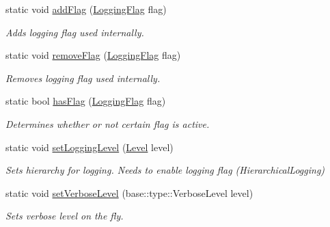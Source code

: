 \begin{DoxyCompactItemize}
static void \hyperlink{classel_1_1_loggers_aedd2de02dd701b0f20ddaa10f1f728f1}{add\+Flag} (\hyperlink{namespaceel_a2784aacd04cb7816ac1c0b20fcbf83cb}{Logging\+Flag} flag)
\begin{DoxyCompactList}\small\item\em Adds logging flag used internally. \end{DoxyCompactList}\item 
\mbox{\label{classel_1_1_loggers_a23fcb4b492f70a34285c45c0b5e2e515}} 
static void \hyperlink{classel_1_1_loggers_a23fcb4b492f70a34285c45c0b5e2e515}{remove\+Flag} (\hyperlink{namespaceel_a2784aacd04cb7816ac1c0b20fcbf83cb}{Logging\+Flag} flag)
\begin{DoxyCompactList}\small\item\em Removes logging flag used internally. \end{DoxyCompactList}\item 
\mbox{\label{classel_1_1_loggers_a591a45565c1eb7073ec3a979df8b5a4c}} 
static bool \hyperlink{classel_1_1_loggers_a591a45565c1eb7073ec3a979df8b5a4c}{has\+Flag} (\hyperlink{namespaceel_a2784aacd04cb7816ac1c0b20fcbf83cb}{Logging\+Flag} flag)
\begin{DoxyCompactList}\small\item\em Determines whether or not certain flag is active. \end{DoxyCompactList}\item 
\mbox{\label{classel_1_1_loggers_afbee019d722fef5148d8355f45ba7993}} 
static void \hyperlink{classel_1_1_loggers_afbee019d722fef5148d8355f45ba7993}{set\+Logging\+Level} (\hyperlink{namespaceel_ab0ac6091262344c52dd2d3ad099e8e36}{Level} level)
\begin{DoxyCompactList}\small\item\em Sets hierarchy for logging. Needs to enable logging flag (Hierarchical\+Logging) \end{DoxyCompactList}\item 
\mbox{\label{classel_1_1_loggers_a826b238fe4f3719305a2d19f0c121fa0}} 
static void \hyperlink{classel_1_1_loggers_a826b238fe4f3719305a2d19f0c121fa0}{set\+Verbose\+Level} (base\+::type\+::\+Verbose\+Level level)
\begin{DoxyCompactList}\small\item\em Sets verbose level on the fly. \end{DoxyCompactList}\item 

\end{DoxyCompactItemize}
